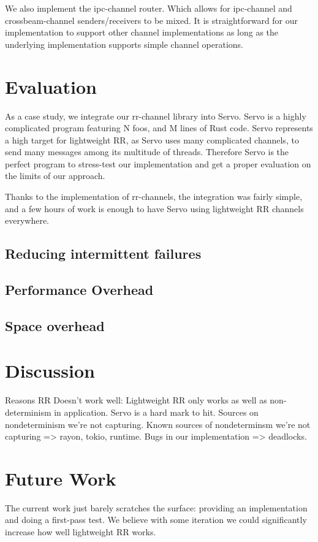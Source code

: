 \documentclass{article}
\begin{document}
We also implement the ipc-channel router. Which allows for ipc-channel and crossbeam-channel
senders/receivers to be mixed. It is straightforward for our implementation to support
other channel implementations as long as the underlying implementation supports simple
channel operations.

\section{Evaluation}
As a case study, we integrate our rr-channel library into Servo. Servo is a highly complicated
program featuring N foos, and M lines of Rust code. Servo represents a high target
for lightweight RR, as Servo uses many complicated channels, to send many messages among
its multitude of threads. Therefore Servo is the perfect program to stress-test our
implementation and get a proper evaluation on the limits of our approach.

Thanks to the implementation of
rr-channels, the integration was fairly simple, and a few hours of work is enough to
have Servo using lightweight RR channels everywhere.

\subsection{Reducing intermittent failures}
\subsection{Performance Overhead}
\subsection{Space overhead}
\section{Discussion}
Reasons RR Doesn't work well:
Lightweight RR only works as well as non-determinism in application.
Servo is a hard mark to hit.
Sources on nondeterminism we're not capturing.
Known sources of nondeterminsm we're not capturing => rayon, tokio, runtime.
Bugs in our implementation => deadlocks.

\section{Future Work}
\label{sec:future_work}
The current work just barely scratches the surface: providing an implementation
and doing a first-pass test. We believe with some iteration we could significantly
increase how well lightweight RR works.
\end{document}
